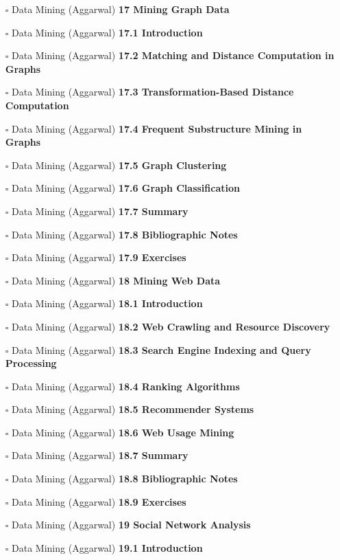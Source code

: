 \documentclass[a4, landscape, 12pt]{article}
\newcommand{\checkbox}{$\square$}%
\begin{document}
\begin{itemize}
{}
\item [\checkbox]  Data Mining (Aggarwal) \textbf{ 17 Mining Graph Data
}
\item [\checkbox]  Data Mining (Aggarwal) \textbf{ 17.1 Introduction
}
\item [\checkbox]  Data Mining (Aggarwal) \textbf{ 17.2 Matching and Distance Computation in Graphs
}
\item [\checkbox]  Data Mining (Aggarwal) \textbf{ 17.3 Transformation-Based Distance Computation
}
\item [\checkbox]  Data Mining (Aggarwal) \textbf{ 17.4 Frequent Substructure Mining in Graphs
}
\item [\checkbox]  Data Mining (Aggarwal) \textbf{ 17.5 Graph Clustering
}
\item [\checkbox]  Data Mining (Aggarwal) \textbf{ 17.6 Graph Classification
}
\item [\checkbox]  Data Mining (Aggarwal) \textbf{ 17.7 Summary
}
\item [\checkbox]  Data Mining (Aggarwal) \textbf{ 17.8 Bibliographic Notes
}
\item [\checkbox]  Data Mining (Aggarwal) \textbf{ 17.9 Exercises
}
\item [\checkbox]  Data Mining (Aggarwal) \textbf{ 18 Mining Web Data
}
\item [\checkbox]  Data Mining (Aggarwal) \textbf{ 18.1 Introduction
}
\item [\checkbox]  Data Mining (Aggarwal) \textbf{ 18.2 Web Crawling and Resource Discovery
}
\item [\checkbox]  Data Mining (Aggarwal) \textbf{ 18.3 Search Engine Indexing and Query Processing
}
\item [\checkbox]  Data Mining (Aggarwal) \textbf{ 18.4 Ranking Algorithms
}
\item [\checkbox]  Data Mining (Aggarwal) \textbf{ 18.5 Recommender Systems
}
\item [\checkbox]  Data Mining (Aggarwal) \textbf{ 18.6 Web Usage Mining
}
\item [\checkbox]  Data Mining (Aggarwal) \textbf{ 18.7 Summary
}
\item [\checkbox]  Data Mining (Aggarwal) \textbf{ 18.8 Bibliographic Notes
}
\item [\checkbox]  Data Mining (Aggarwal) \textbf{ 18.9 Exercises
}
\item [\checkbox]  Data Mining (Aggarwal) \textbf{ 19 Social Network Analysis
}
\item [\checkbox]  Data Mining (Aggarwal) \textbf{ 19.1 Introduction
}
\end{itemize}
\end{document}
